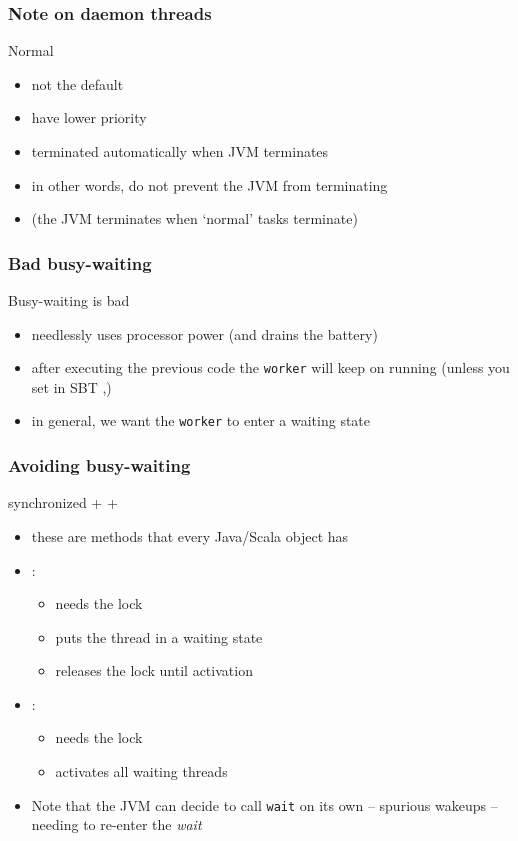 \documentclass[aspectratio=169]{beamer}
\begin{document}
\begin{frame}\frametitle{Note on daemon threads}
  \begin{alertblock}{Normal}
    \begin{itemize}
      \item not the default
      \item have lower priority
      \item terminated automatically when JVM terminates
      \item in other words, do not prevent the JVM from terminating
      \item (the JVM terminates when `normal' tasks terminate)
    \end{itemize}    
  \end{alertblock}
\end{frame}


\begin{frame}\frametitle{Bad busy-waiting}
    
  \begin{block}{Busy-waiting is bad}
    \begin{itemize}
      \item needlessly uses processor power (and drains the battery)
      \item after executing the previous code the \texttt{worker} will keep on running (unless you set in SBT ,)
      \item in general, we want the \texttt{worker} to enter a waiting state
    \end{itemize}
    
  \end{block}
\end{frame}

\begin{frame}\frametitle{Avoiding busy-waiting}
\centering

{\Large \alert{synchronized} +  + }

\begin{itemize}
  \item these are methods that every Java/Scala object has
  \item {}:
    \begin{itemize}
      \item needs the lock
      \item puts the thread in a \alert{waiting} state
      \item releases the lock until activation
    \end{itemize}
  \item {}:
    \begin{itemize}
      \item needs the lock
      \item \alert{activates} all waiting threads
    \end{itemize}
  \item Note that the JVM can decide to call \texttt{wait} on its own -- \alert{spurious wakeups} -- needing to re-enter the \emph{wait}
\end{itemize}
\end{frame}
\end{document}
